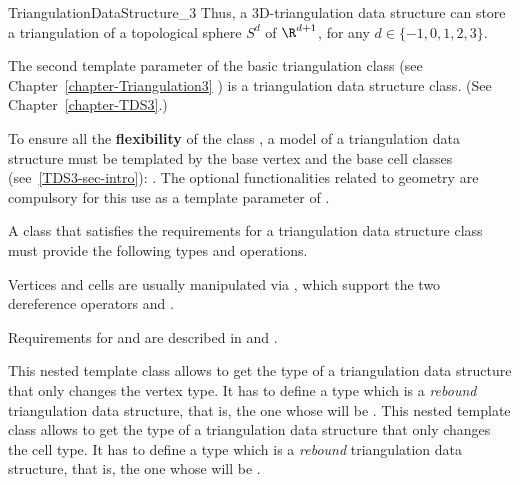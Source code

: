 \begin{ccRefConcept}{TriangulationDataStructure_3}
Thus, a 3D-triangulation data structure can store a triangulation of a
topological sphere $S^d$ of $\R^{d+1}$, for any $d \in \{-1,0,1,2,3\}$. 

\bigskip

The second template parameter of the basic triangulation class
(see Chapter~\ref{chapter-Triangulation3}
)
 is a triangulation data structure class. (See
Chapter~\ref{chapter-TDS3}.)  

To ensure all the \textbf{flexibility} of the class , a
model of a triangulation data structure must be templated by the base vertex
and the base cell classes (see~\ref{TDS3-sec-intro}):
.
The optional functionalities related to geometry are compulsory for
this use as a template parameter of .

\bigskip

A class that satisfies the requirements for a triangulation data structure
class must provide the following types and operations. 

\ccTypes
{}
\ccThreeToTwo

\ccGlue
{}

\ccGlue
{}

Vertices and cells are usually manipulated via , which support
the two dereference operators  and .

\ccGlue
{}

Requirements for  and  are described in
 and
 .

\begin{ccAdvanced}
{This nested template class allows to get the type of a triangulation
data structure that only changes the vertex type.  It has to define a type
 which is a {\it rebound} triangulation data structure, that is, the
one whose  will be .}
\ccGlue
{}
{This nested template class allows to get the type of a triangulation
data structure that only changes the cell type.  It has to define a type
 which is a {\it rebound} triangulation data structure, that is, the
one whose  will be .}
\end{ccAdvanced}



\end{ccRefConcept}
